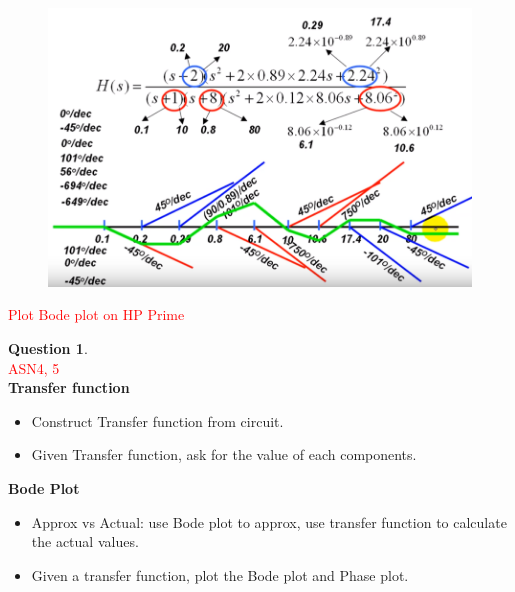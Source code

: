 \documentclass[10pt,landscape]{article}
\newcommand\todo[1]{\textcolor{red}{#1}}
\theoremstyle{definition}
\newtheorem*{question}{Question}
\theoremstyle{remark}
\begin{document}
\begin{multicols}{3}
\begin{figure}[H]
    \centering
    \includegraphics[width=\linewidth]{202/figure/bode_2.png}
    \caption{}
    \label{fig:bode_2}
\end{figure}


\todo{Plot Bode plot on HP Prime}

\begin{question} \mbox{}\\
\todo{ASN4, 5}\\
\textbf{Transfer function}
\begin{itemize}[noitemsep,nolistsep]
    \item Construct Transfer function from circuit. 
    \item Given Transfer function, ask for the value of each components.
\end{itemize}

\textbf{Bode Plot}
\begin{itemize}[noitemsep,nolistsep]
    \item Approx vs Actual: use Bode plot to approx, use transfer function to calculate the actual values.  
    \item Given a transfer function, plot the Bode plot and Phase plot. 
\end{itemize}
\end{question}


\end{multicols}
\end{document}
